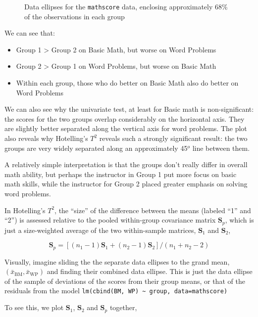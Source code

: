 \documentclass[
  letterpaper,
  10pt,
  krantz2]{krantz}
\providecommand{\tightlist}{%
  \setlength{\itemsep}{0pt}\setlength{\parskip}{0pt}}\usepackage{longtable,booktabs,array}
\begin{document}
{\begin{figure}[H]
{}

\caption{\label{fig-mathscore-cov1}Data ellipses for the
\texttt{mathscore} data, enclosing approximately 68\% of the
observations in each group}

\end{figure}%

We can see that:

\begin{itemize}
\tightlist
\item
  Group 1 \textgreater{} Group 2 on Basic Math, but worse on Word
  Problems
\item
  Group 2 \textgreater{} Group 1 on Word Problems, but worse on Basic
  Math
\item
  Within each group, those who do better on Basic Math also do better on
  Word Problems
\end{itemize}

We can also see why the univariate test, at least for Basic math is
non-significant: the scores for the two groups overlap considerably on
the horizontal axis. They are slightly better separated along the
vertical axis for word problems. The plot also reveals why Hotelling's
\(T^2\) reveals such a strongly significant result: the two groups are
very widely separated along an approximately 45\(^o\) line between them.

A relatively simple interpretation is that the groups don't really
differ in overall math ability, but perhaps the instructor in Group 1
put more focus on basic math skills, while the instructor for Group 2
placed greater emphasis on solving word problems.

In Hotelling's \(T^2\), the ``size'' of the difference between the means
(labeled ``1'' and ``2'') is assessed relative to the pooled
within-group covariance matrix \(\mathbf{S}_p\), which is just a
size-weighted average of the two within-sample matrices,
\(\mathbf{S}_1\) and \(\mathbf{S}_2\),

\[
\mathbf{S}_p = [ (n_1 - 1) \mathbf{S}_1 + (n_2 - 1) \mathbf{S}_2 ] / (n_1 + n_2 - 2)
\]

Visually, imagine sliding the the separate data ellipses to the grand
mean, \((\bar{x}_{\text{BM}}, \bar{x}_{\text{WP}})\) and finding their
combined data ellipse. This is just the data ellipse of the sample of
deviations of the scores from their group means, or that of the
residuals from the model
\texttt{lm(cbind(BM,\ WP)\ \textasciitilde{}\ group,\ data=mathscore)}

To see this, we plot \(\mathbf{S}_1\), \(\mathbf{S}_2\) and
\(\mathbf{S}_p\) together,

}
\end{document}
